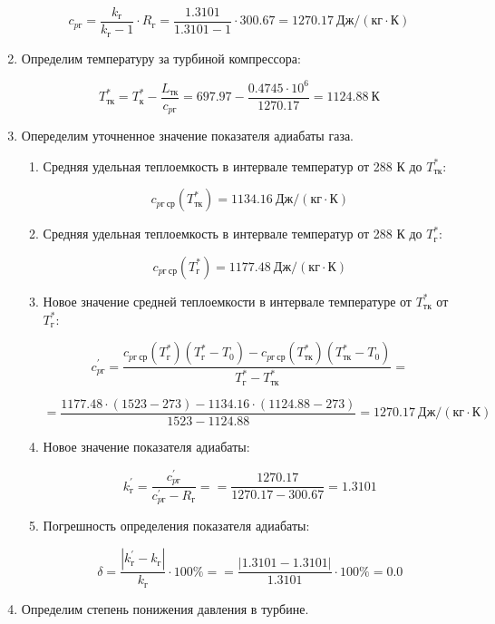 \documentclass[a4paper,12pt]{article}
\begin{document}
\begin{enumerate}
	\[
	c_{pг} = \frac{ k_г }{ k_г - 1 } \cdot R_г = 
			\frac{ 1.3101 }{ 1.3101 - 1 } \cdot 300.67 = 
			1270.17\ Дж / (кг \cdot К)
	\]
	
	\item Определим температуру за турбиной компрессора:
	
	\[
	T_{тк}^* = T_к^* - \frac{ L_{тк} }{ c_{pг} } = 
			697.97 - \frac{ 0.4745 \cdot 10^6  }{ 1270.17 } = 
			1124.88\ К
	\]
	
	\item Опеределим уточненное значение показателя адиабаты газа.
	
	\begin{enumerate}
	
		\item Средняя удельная теплоемкость в интервале температур от 288 К до $ T_{тк}^* $:
		
		\[
		c_{pг\ ср} (T_{тк}^*) = 1134.16\ Дж / (кг \cdot К)
		\]
		
		\item Средняя удельная теплоемкость в интервале температур от 288 К до $ T_{г}^* $:
		
		\[
		c_{pг\ ср} (T_{г}^*) = 1177.48\ Дж / (кг \cdot К)
		\]
		
		\item Новое значение средней теплоемкости в интервале температуре от $ T_{тк}^* $ от $ T_{г}^* $:
		
		\[c_{pг}^\prime = \frac{
		c_{pг\ ср}(T_г^*) (T_г^* - T_0) - c_{pг\ ср}(T_{тк}^*) (T_{тк}^* - T_0)
		}{
		T_г^* - T_{тк}^*} = \]
		
		\[ =\frac{
		1177.48 \cdot (1523 - 273) - 
		1134.16 \cdot (1124.88 - 273)
		}{
		1523 - 1124.88} = 
		1270.17 \ Дж / (кг \cdot К)
		\]
		
		\item Новое значение показателя адиабаты:
		
		\[
		k_{г}^\prime = \frac{ c_{pг}^\prime }{ c_{pг}^\prime - R_г } = 
				= \frac{ 1270.17 }{ 1270.17 - 300.67 } =
				1.3101
		\]
		
		\item Погрешность определения показателя адиабаты:
		
		\[
		\delta = \frac{ \left| k_{г}^\prime - k_{г} \right| }{ k_{г} } \cdot 100 \% =
				= \frac{ \left| 1.3101 - 1.3101 \right| }{ 1.3101 } \cdot 100 \%
				= 0.0
		\]
	
	\end{enumerate}
	
	\item Определим степень понижения давления в турбине.
	

\end{enumerate}
\end{document}
